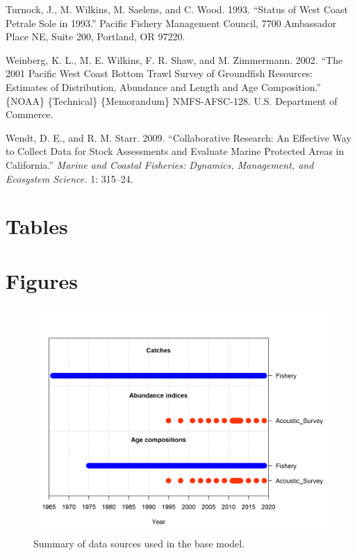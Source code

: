 \documentclass[11pt,
  english,
  letterpaper,
]{article}
\newlength{\cslhangindent}
\newenvironment{CSLReferences}[2] %
 {%
  \setlength{\parindent}{0pt}
  \ifodd #1 \everypar{\setlength{\hangindent}{\cslhangindent}}\ignorespaces\fi
  \ifnum #2 > 0
  \setlength{\parskip}{#2\baselineskip}
  \fi
 }%
 {}
\begin{document}
\begin{CSLReferences}{1}{0}
\leavevmode{}%
Turnock, J., M. Wilkins, M. Saelens, and C. Wood. 1993. {``Status of {West} {Coast} Petrale Sole in 1993.''} Pacific Fishery Management Council, 7700 Ambassador Place NE, Suite 200, Portland, OR 97220.

\leavevmode{}%
Weinberg, K. L., M. E. Wilkins, F. R. Shaw, and M. Zimmermann. 2002. {``The 2001 {Pacific} {West} {Coast} Bottom Trawl Survey of Groundfish Resources: Estimates of Distribution, Abundance and Length and Age Composition.''} \{NOAA\} \{Technical\} \{Memorandum\} NMFS-AFSC-128. U.S. Department of Commerce.

\leavevmode{}%
Wendt, D. E., and R. M. Starr. 2009. {``Collaborative Research: An Effective Way to Collect Data for Stock Assessments and Evaluate Marine Protected Areas in {C}alifornia.''} \emph{Marine and Coastal Fisheries: Dynamics, Management, and Ecosystem Science.} 1: 315--24.

\end{CSLReferences}

\clearpage

\hypertarget{tables}{%
\section{Tables}\label{tables}}

\clearpage

\hypertarget{figures}{%
\section{Figures}\label{figures}}

\begin{figure}
\centering
\includegraphics[width=1\textwidth,height=1\textheight]{data-plot.png}
\caption{Summary of data sources used in the base model.\label{fig:data-plot}}
\end{figure}
\end{document}
